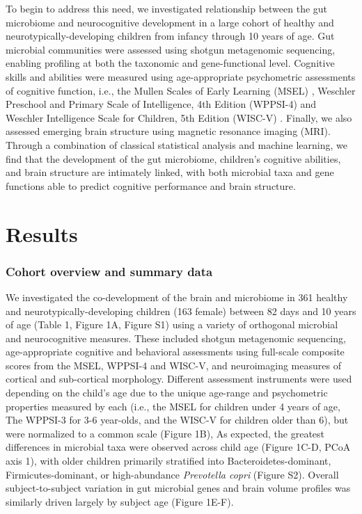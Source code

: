 \documentclass{article}
\begin{document}
To begin to address this need, we investigated relationship between
the gut microbiome and
neurocognitive development in a large cohort of healthy and neurotypically-developing
children from infancy through 10 years of age. Gut microbial
communities were assessed using shotgun metagenomic sequencing, enabling
profiling at both the taxonomic and gene-functional level.
Cognitive skills and abilities were measured using age-appropriate
psychometric assessments of cognitive function, i.e.,
the Mullen Scales of Early Learning (MSEL) \cite{mullenMullenScalesEarly1995},
Weschler Preschool and Primary Scale of Intelligence, 4th Edition (WPPSI-4) 
\cite{wechslerWechslerPreschoolPrimary2012}
and Weschler Intelligence Scale for Children, 5th Edition (WISC-V)
\cite{wechslerWechslerIntelligenceScale1949}.
Finally, we also assessed emerging brain structure using magnetic resonance imaging
(MRI). Through a combination of classical statistical analysis and machine
learning, we find that the development of the gut microbiome,
children's cognitive abilities, and brain structure are intimately linked, with
both microbial taxa and gene functions able to predict cognitive
performance and brain structure.

\section*{Results}

\subsubsection*{Cohort overview and summary data}

We investigated the co-development of the brain and microbiome in
361 healthy and neurotypically-developing children (163 female) between 82 days and 10 years of age
(Table 1,  Figure 1A, Figure S1)
using a variety of orthogonal microbial and neurocognitive measures.
These included shotgun metagenomic sequencing,
age-appropriate cognitive and behavioral assessments
using full-scale composite scores from the MSEL, WPPSI-4 and WISC-V,
and neuroimaging measures of cortical and sub-cortical morphology. 
Different assessment instruments were used depending on the child's age
due to the unique age-range and psychometric properties measured by each
(i.e., the MSEL for children under 4 years of age, The WPPSI-3 for 3-6 year-olds,
and the WISC-V for children older than 6), but were normalized to a common scale (Figure 1B),
As expected, the greatest differences in microbial taxa were observed across
child age (Figure 1C-D, PCoA axis 1), with older children primarily
stratified into Bacteroidetes-dominant, Firmicutes-dominant, or
high-abundance \emph{Prevotella copri} (Figure S2).
Overall subject-to-subject variation in gut microbial genes
and brain volume profiles was similarly driven largely by subject age (Figure 1E-F).
\end{document}
